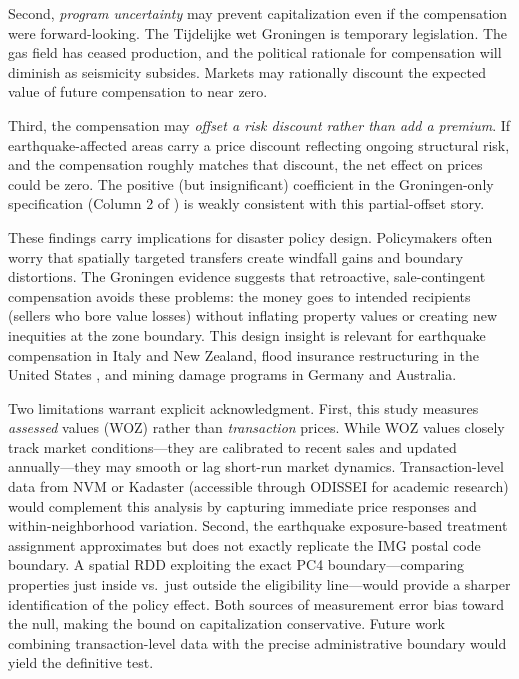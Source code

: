 \documentclass[12pt]{article}
\begin{document}
Second, \emph{program uncertainty} may prevent capitalization even if the compensation were forward-looking. The Tijdelijke wet Groningen is temporary legislation. The gas field has ceased production, and the political rationale for compensation will diminish as seismicity subsides. Markets may rationally discount the expected value of future compensation to near zero.

Third, the compensation may \emph{offset a risk discount rather than add a premium}. If earthquake-affected areas carry a price discount reflecting ongoing structural risk, and the compensation roughly matches that discount, the net effect on prices could be zero. The positive (but insignificant) coefficient in the Groningen-only specification (Column 2 of ) is weakly consistent with this partial-offset story.

These findings carry implications for disaster policy design. Policymakers often worry that spatially targeted transfers create windfall gains and boundary distortions. The Groningen evidence suggests that retroactive, sale-contingent compensation avoids these problems: the money goes to intended recipients (sellers who bore value losses) without inflating property values or creating new inequities at the zone boundary. This design insight is relevant for earthquake compensation in Italy and New Zealand, flood insurance restructuring in the United States \citep{gallagher2014}, and mining damage programs in Germany and Australia.

Two limitations warrant explicit acknowledgment. First, this study measures \emph{assessed} values (WOZ) rather than \emph{transaction} prices. While WOZ values closely track market conditions---they are calibrated to recent sales and updated annually---they may smooth or lag short-run market dynamics. Transaction-level data from NVM or Kadaster (accessible through ODISSEI for academic research) would complement this analysis by capturing immediate price responses and within-neighborhood variation. Second, the earthquake exposure-based treatment assignment approximates but does not exactly replicate the IMG postal code boundary. A spatial RDD exploiting the exact PC4 boundary---comparing properties just inside vs.\ just outside the eligibility line---would provide a sharper identification of the policy effect. Both sources of measurement error bias toward the null, making the bound on capitalization conservative. Future work combining transaction-level data with the precise administrative boundary would yield the definitive test.
\end{document}
